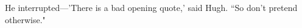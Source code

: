 \documentclass{article}
\begin{document}
He interrupted---'There is a bad opening quote,' said Hugh. ``So don't pretend otherwise."
\end{document}
